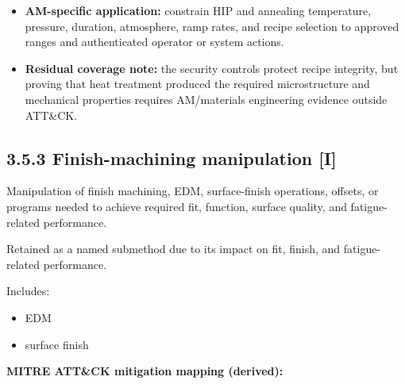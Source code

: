 \documentclass[10pt,a4paper,oneside]{report}
\begin{document}
\begin{itemize}
\item \textbf{AM-specific application:} constrain HIP and annealing temperature, pressure, duration, atmosphere, ramp rates, and recipe selection to approved ranges and authenticated operator or system actions.
\end{itemize}

\begin{itemize}
\item \textbf{Residual coverage note:} the security controls protect recipe integrity, but proving that heat treatment produced the required microstructure and mechanical properties requires AM/materials engineering evidence outside ATT\&CK.
\end{itemize}


\subsection{3.5.3 Finish-machining manipulation [I]}


Manipulation of finish machining, EDM, surface-finish operations, offsets, or programs needed to achieve required fit, function, surface quality, and fatigue-related performance.

Retained as a named submethod due to its impact on fit, finish, and fatigue-related performance.

Includes:

\begin{itemize}
\item EDM
\item surface finish
\end{itemize}

\textbf{MITRE ATT\&CK mitigation mapping (derived):}
\end{document}
